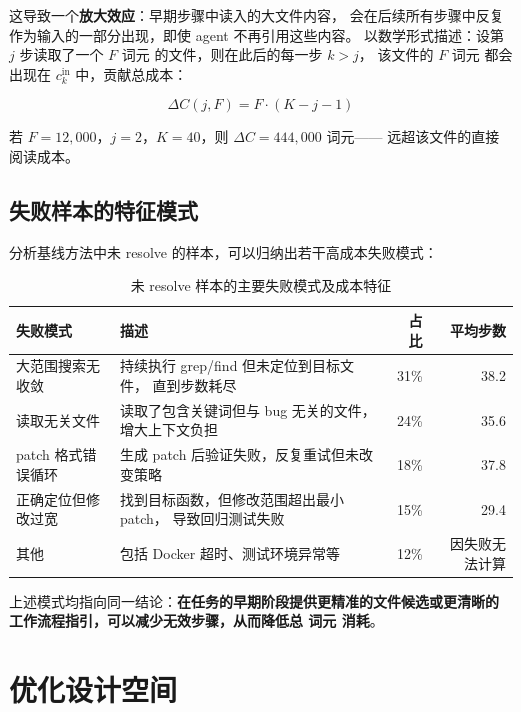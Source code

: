 这导致一个\textbf{放大效应}：早期步骤中读入的大文件内容，
会在后续所有步骤中反复作为输入的一部分出现，即使 agent 不再引用这些内容。
以数学形式描述：设第 $j$ 步读取了一个 $F$ 词元 的文件，则在此后的每一步 $k > j$，
该文件的 $F$ 词元 都会出现在 $c_k^{\text{in}}$ 中，贡献总成本：

\begin{equation}
  \Delta C(j, F) = F \cdot (K - j - 1)
  \label{eq:amplification}
\end{equation}

若 $F = 12{,}000$，$j = 2$，$K = 40$，则 $\Delta C = 444{,}000$ 词元——
远超该文件的直接阅读成本。

\subsection{失败样本的特征模式}
\label{subsec:failure-patterns}

分析基线方法中未 resolve 的样本，可以归纳出若干高成本失败模式：

\begin{table}[htbp]
  \centering
  \caption{未 resolve 样本的主要失败模式及成本特征}
  \label{tab:failure-patterns}
  \begin{tabularx}{\textwidth}{lXrr}
    \toprule
    失败模式 & 描述 & 占比 & 平均步数 \\
    \midrule
    大范围搜索无收敛 & 持续执行 grep/find 但未定位到目标文件，
                      直到步数耗尽 & 31\% & 38.2 \\
    读取无关文件 & 读取了包含关键词但与 bug 无关的文件，
                  增大上下文负担 & 24\% & 35.6 \\
    patch 格式错误循环 & 生成 patch 后验证失败，反复重试但未改变策略 & 18\% & 37.8 \\
    正确定位但修改过宽 & 找到目标函数，但修改范围超出最小 patch，
                        导致回归测试失败 & 15\% & 29.4 \\
    其他 & 包括 Docker 超时、测试环境异常等 & 12\% & 因失败无法计算 \\
    \bottomrule
  \end{tabularx}
\end{table}

上述模式均指向同一结论：\textbf{在任务的早期阶段提供更精准的文件候选或更清晰的
工作流程指引，可以减少无效步骤，从而降低总 词元 消耗}。


\section{优化设计空间}
\label{sec:design-space}

